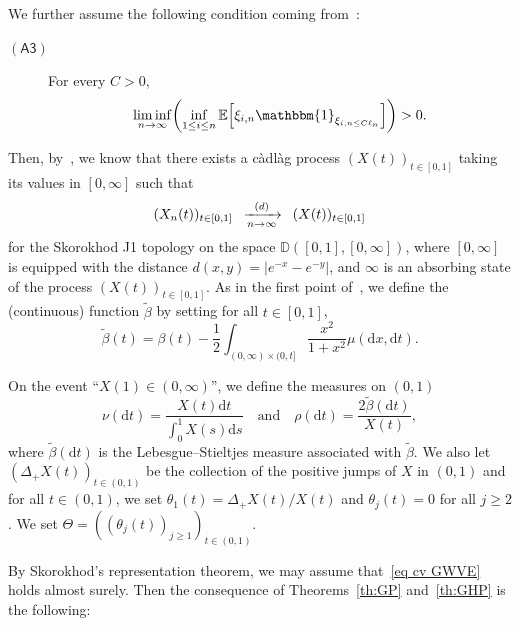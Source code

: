 \documentclass[AHL,Unicode,published]{cedram}
\makeatletter
\newcommand{\optionaldesc}[2]{
\phantomsection #1\protected@edef\@currentlabel{#1}\label{#2}
}
\newcommand{\cvloi}[1][n]{\enskip\xrightarrow[#1 \to \infty]{(d)}\enskip}
\newcommand{\rmd}{\mathrm{d}}
\newcommand{\E}{\mathbb{E}}
\newcommand{\1}{\mathbbm{1}}
\let\originalleft\left
\let\originalright\right
\renewcommand{\left}{\mathopen{}\mathclose\bgroup\originalleft}
\renewcommand{\right}{\aftergroup\egroup\originalright}
\renewcommand*{\to}{\mathchoice{\longrightarrow}{\rightarrow}{\rightarrow}{\rightarrow}}
\makeatother
\begin{document}
We further assume the following condition coming from~\cite[Proposition~2.2]{BS15}:
\begin{description}
\item[\textcolor{link}{\optionaldesc{$(\mathsf{A3})$}{hyp:nobottleneck}}] For every $C>0$,
\[
\liminf_{n\to \infty} \left(\inf_{1 \le i \le n }
\E\left[\xi_{i,n} \1_{\xi_{i,n \le C \ell_n}}\right]\right)>0.
\]
\end{description} Then, by~\cite[Theorem~2.1]{BS15}, we know that there exists a càdlàg process $(X(t))_{t\in [0,1]}$ taking its values in $[0,\infty]$ such that
\begin{equation}\label{eq cv GWVE}
(X_n(t))_{t \in [0,1]}\cvloi[n](X(t))_{t\in [0,1]}
\end{equation}
for the Skorokhod J1 topology on the space $\mathbb{D}([0,1], [0,\infty])$, where $[0,\infty]$ is equipped with the distance $d(x,y) = | e^{-x}-e^{-y}|$, and $\infty$ is an absorbing state of the process $(X(t))_{t\in [0,1]}$. As in the first point of~\cite[Theorem~2.1]{BS15}, we define the {(continuous)} function $\widetilde{\beta}$ by setting for all $t \in [0,1]$,
\[
\widetilde{\beta}(t) = \beta(t) - \frac{1}{2} \int_{(0,\infty) \times (0,t]} \frac{x^2}{1+x^2} \mu(\rmd x,\rmd t).
\]

On the event ``$X(1) \in (0,\infty)$'', we define the measures on $(0,1)$
\[
\nu(\rmd t) = \frac{X(t)\rmd t}{\int_0^1 X(s) \rmd s} \quad\text{and}\quad
\rho(\rmd t) = \frac{2\widetilde{\beta}(\rmd t)}{X(t)},
\]
where $\widetilde{\beta}(\rmd t)$ is the Lebesgue--Stieltjes measure associated with $\widetilde{\beta}$. We also let\linebreak $(\Delta_+X(t))_{t \in (0,1)}$ be the collection of the positive jumps of $X$ in $(0,1)$ and for all $t\in (0,1)$, we set $\theta_1(t) = \Delta_+X(t)/X(t)$ and $\theta_j(t)=0$ for all $j\ge 2$. We set $\Theta = ((\theta_j(t))_{j\ge 1})_{t\in (0,1)}$.

By Skorokhod's representation theorem, we may assume that~\eqref{eq cv GWVE} holds almost surely. Then the consequence of Theorems~\ref{th:GP} and~\ref{th:GHP} is the following:
\end{document}

